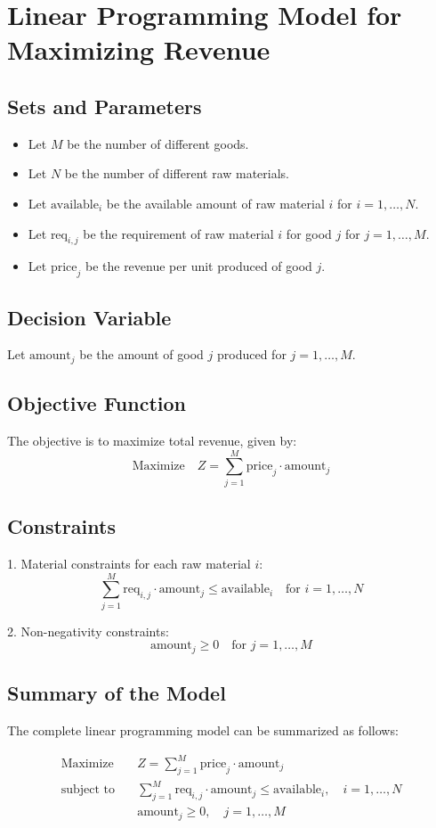 \documentclass{article}
\begin{document}
\section*{Linear Programming Model for Maximizing Revenue}

\subsection*{Sets and Parameters}
\begin{itemize}
    \item Let \( M \) be the number of different goods.
    \item Let \( N \) be the number of different raw materials.
    \item Let \( \text{available}_i \) be the available amount of raw material \( i \) for \( i = 1, \ldots, N \).
    \item Let \( \text{req}_{i,j} \) be the requirement of raw material \( i \) for good \( j \) for \( j = 1, \ldots, M \).
    \item Let \( \text{price}_j \) be the revenue per unit produced of good \( j \).
\end{itemize}

\subsection*{Decision Variable}
Let \( \text{amount}_j \) be the amount of good \( j \) produced for \( j = 1, \ldots, M \).

\subsection*{Objective Function}
The objective is to maximize total revenue, given by:
\[
\text{Maximize} \quad Z = \sum_{j=1}^{M} \text{price}_j \cdot \text{amount}_j
\]

\subsection*{Constraints}
1. Material constraints for each raw material \( i \):
\[
\sum_{j=1}^{M} \text{req}_{i,j} \cdot \text{amount}_j \leq \text{available}_i \quad \text{for } i = 1, \ldots, N
\]

2. Non-negativity constraints:
\[
\text{amount}_j \geq 0 \quad \text{for } j = 1, \ldots, M
\]

\subsection*{Summary of the Model}
The complete linear programming model can be summarized as follows:

\begin{align*}
\text{Maximize} \quad & Z = \sum_{j=1}^{M} \text{price}_j \cdot \text{amount}_j \\
\text{subject to} \quad & \sum_{j=1}^{M} \text{req}_{i,j} \cdot \text{amount}_j \leq \text{available}_i, \quad i = 1, \ldots, N \\
& \text{amount}_j \geq 0, \quad j = 1, \ldots, M
\end{align*}
\end{document}
